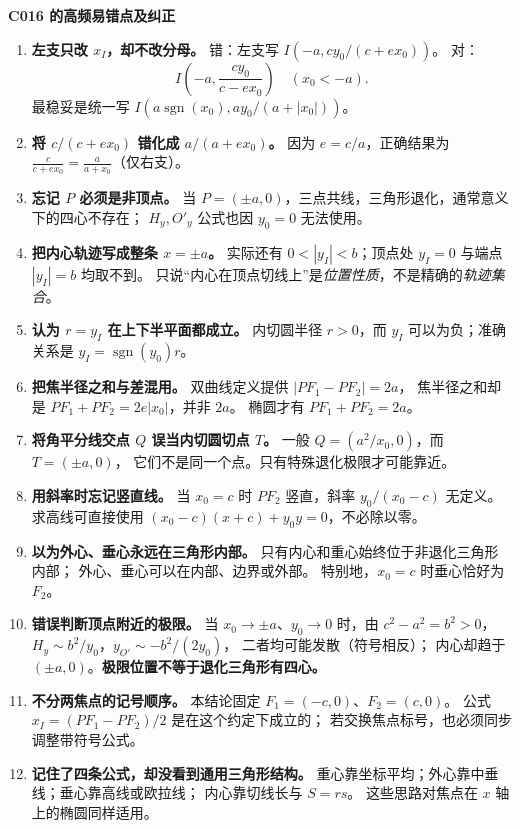 \begin{trapbox}
\textbf{C016 的高频易错点及纠正}
\begin{enumerate}
  \item \textbf{左支只改 $x_I$，却不改分母。}
  错：左支写 $I(-a,cy_0/(c+ex_0))$。
  对：\[\boxed{I\left(-a,\frac{cy_0}{c-ex_0}\right)}\quad(x_0<-a).\]
  最稳妥是统一写 $I\left(a\operatorname{sgn}(x_0),ay_0/(a+|x_0|)\right)$。

  \item \textbf{将 $c/(c+ex_0)$ 错化成 $a/(a+ex_0)$。}
  因为 $e=c/a$，正确结果为
  $\displaystyle \frac{c}{c+ex_0}=\frac{a}{a+x_0}$（仅右支）。

  \item \textbf{忘记 $P$ 必须是非顶点。}
  当 $P=(\pm a,0)$，三点共线，三角形退化，通常意义下的四心不存在；
  $H_y,O'_y$ 公式也因 $y_0=0$ 无法使用。

  \item \textbf{把内心轨迹写成整条 $x=\pm a$。}
  实际还有 $0<|y_I|<b$；顶点处 $y_I=0$ 与端点 $|y_I|=b$ 均取不到。
  只说“内心在顶点切线上”是\emph{位置性质}，不是精确的\emph{轨迹集合}。

  \item \textbf{认为 $r=y_I$ 在上下半平面都成立。}
  内切圆半径 $r>0$，而 $y_I$ 可以为负；准确关系是
  $y_I=\operatorname{sgn}(y_0)r$。

  \item \textbf{把焦半径之和与差混用。}
  双曲线定义提供 $|PF_1-PF_2|=2a$，
  焦半径之和却是 $PF_1+PF_2=2e|x_0|$，并非 $2a$。
  椭圆才有 $PF_1+PF_2=2a$。

  \item \textbf{将角平分线交点 $Q$ 误当内切圆切点 $T$。}
  一般 $Q=(a^2/x_0,0)$，而 $T=(\pm a,0)$，
  它们不是同一个点。只有特殊退化极限才可能靠近。

  \item \textbf{用斜率时忘记竖直线。}
  当 $x_0=c$ 时 $PF_2$ 竖直，斜率 $y_0/(x_0-c)$ 无定义。
  求高线可直接使用
  $(x_0-c)(x+c)+y_0y=0$，不必除以零。

  \item \textbf{以为外心、垂心永远在三角形内部。}
  只有内心和重心始终位于非退化三角形内部；
  外心、垂心可以在内部、边界或外部。
  特别地，$x_0=c$ 时垂心恰好为 $F_2$。

  \item \textbf{错误判断顶点附近的极限。}
  当 $x_0\to\pm a$、$y_0\to0$ 时，由 $c^2-a^2=b^2>0$，
  $H_y\sim b^2/y_0$，$y_{O'}\sim-b^2/(2y_0)$，
  二者均可能发散（符号相反）；
  内心却趋于 $(\pm a,0)$。\textbf{极限位置不等于退化三角形有四心。}

  \item \textbf{不分两焦点的记号顺序。}
  本结论固定 $F_1=(-c,0)$、$F_2=(c,0)$。
  公式 $x_I=(PF_1-PF_2)/2$ 是在这个约定下成立的；
  若交换焦点标号，也必须同步调整带符号公式。

  \item \textbf{记住了四条公式，却没看到通用三角形结构。}
  重心靠坐标平均；外心靠中垂线；垂心靠高线或欧拉线；
  内心靠切线长与 $S=rs$。
  这些思路对焦点在 $x$ 轴上的椭圆同样适用。
\end{enumerate}
\end{trapbox}
